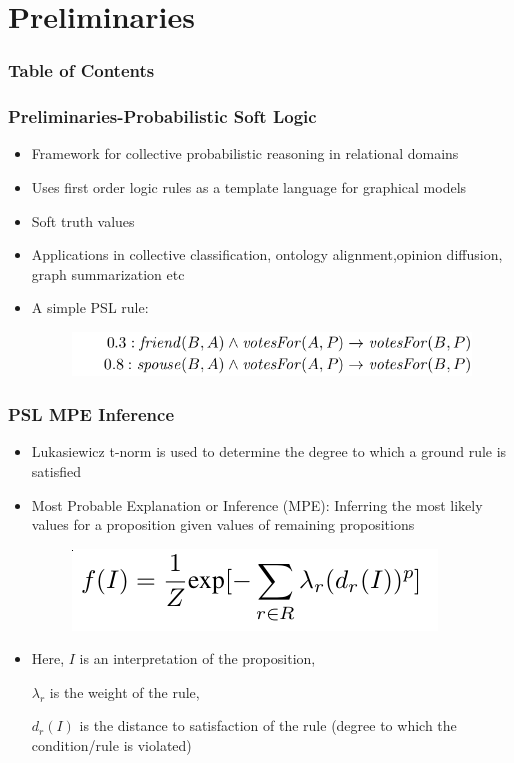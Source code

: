 \documentclass[red]{beamer}
\begin{document}
\section{Preliminaries}
\begin{frame}
\frametitle{Table of Contents}
\tableofcontents[currentsection]
\end{frame}
\begin{frame}
\frametitle{Preliminaries-Probabilistic Soft Logic}
    \begin{itemize}
        \item
            Framework for collective probabilistic reasoning in relational domains
        \item
            Uses first order logic rules as a template language for graphical models
        \item
            Soft truth values
        \item
            Applications in collective classification, ontology alignment,opinion diffusion, graph summarization etc
        \item
            A simple PSL rule:
            \begin{figure}
                \includegraphics[scale=0.3]{psl_rule_example}
            \end{figure}
    \end{itemize}
\end{frame}

\begin{frame}
    \frametitle{PSL MPE Inference}
    \begin{itemize}
        \item Lukasiewicz t-norm is used to determine the degree to which a ground rule is satisfied
        \item Most Probable Explanation or Inference (MPE): Inferring the most likely values for a proposition given values of remaining propositions
            \begin{figure}
                \includegraphics[scale=0.4]{psl_equation}
            \end{figure}
        \item Here,
            $I$ is an interpretation of the proposition,

            $\lambda_r$ is the weight of the rule,

            $d_r(I)$ is the distance to satisfaction of the rule (degree to which the condition/rule is violated)
        \end{itemize}
\end{frame}
\end{document}
